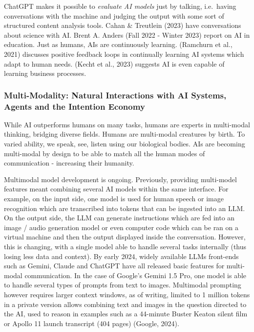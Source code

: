 \documentclass[
  letterpaper,
  DIV=11,
  numbers=noendperiod]{scrartcl}
\begin{document}
ChatGPT makes it possible to \emph{evaluate AI models} just by talking,
i.e.~having conversations with the machine and judging the output with
some sort of structured content analysis tools. Cahan \& Treutlein
(2023) have conversations about science with AI. Brent A. Anders (Fall
2022 - Winter 2023) report on AI in education. Just as humans, AIs are
continuously learning. (Ramchurn et al., 2021) discusses positive
feedback loops in continually learning AI systems which adapt to human
needs. (Kecht et al., 2023) suggests AI is even capable of learning
business processes.

\subsubsection{Multi-Modality: Natural Interactions with AI Systems,
Agents and the Intention
Economy}\label{multi-modality-natural-interactions-with-ai-systems-agents-and-the-intention-economy}

While AI outperforms humans on many tasks, humans are experts in
multi-modal thinking, bridging diverse fields. Humans are multi-modal
creatures by birth. To varied ability, we speak, see, listen using our
biological bodies. AIs are becoming multi-modal by design to be able to
match all the human modes of communication - increasing their humanity.

Multimodal model development is ongoing. Previously, providing
multi-model features meant combining several AI models within the same
interface. For example, on the input side, one model is used for human
speech or image recognition which are transcribed into tokens that can
be ingested into an LLM. On the output side, the LLM can generate
instructions which are fed into an image / audio generation model or
even computer code which can be ran on a virtual machine and then the
output displayed inside the conversation. However, this is changing,
with a single model able to handle several tasks internally (thus losing
less data and context). By early 2024, widely available LLMs front-ends
such as Gemini, Claude and ChatGPT have all released basic features for
multi-modal communication. In the case of Google's Gemini 1.5 Pro, one
model is able to handle several types of prompts from text to images.
Multimodal prompting however requires larger context windows, as of
writing, limited to 1 million tokens in a private version allows
combining text and images in the question directed to the AI, used to
reason in examples such as a 44-minute Buster Keaton silent film or
Apollo 11 launch transcript (404 pages) (Google, 2024).
\end{document}
